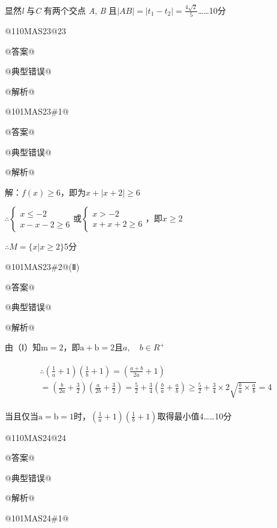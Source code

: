 \documentclass{scrbook}
\begin{document}
显然\textit{l} 与\textit{C} 有两个交点 \textit{A}, \textit{B} 且$|AB|=\left|t_{1}- t_{2}\right|=\frac{4\sqrt{2}}{5}${\ldots}{\ldots}10分

@110MA{\textbar}S23@23

@答案@

@典型错误@

@解析@

@101MA{\textbar}S23\#1@\raisebox{-2.5pt}{（Ⅰ）}

@答案@

@典型错误@

@解析@

解：$f(x)\geq 6，\mathrm{即为}x+|x+2|\geq 6$

$\therefore \left\{\begin{array}{l}
x\leq - 2\\
x- x- 2\geq 6
\end{array}\right.$或$\left\{\begin{array}{l}
x>- 2\\
x+x+2\geq 6
\end{array}\right.$，即$x\geq 2$

$\therefore M=\{x|x\geq 2\}$\raisebox{-5pt}{{\ldots}{\ldots}}5分

@101MA{\textbar}S23\#2@(Ⅱ)

@答案@

@典型错误@

@解析@

由（Ⅰ）知$\mathrm{m}=2$，即$\mathrm{a}+\mathrm{b}=2$且$a,{\quad} b\in R^{+}$

\begin{align*}
\begin{array}{l}
\therefore \left(\frac{1}{a}+1\right)\left(\frac{1}{b}+1\right)=\left(\frac{a+b}{2a}+1\right)\\
=\left(\frac{b}{2a}+\frac{3}{2}\right)\left(\frac{a}{2b}+\frac{3}{2}\right)=\frac{5}{2}+\frac{3}{4}\left(\frac{b}{a}+\frac{a}{b}\right)\geq \frac{5}{2}+\frac{3}{4}\times 2\sqrt{\frac{b}{a}\times \frac{a}{b}}=4
\end{array}
\end{align*}

当且仅当$\mathrm{a}=\mathrm{b}=1$时，$\left(\frac{1}{a}+1\right)\left(\frac{1}{b}+1\right)$取得最小值4{\ldots}{\ldots}10分

@110MA{\textbar}S24@24

@答案@

@典型错误@

@解析@

@101MA{\textbar}S24\#1@\raisebox{-2.5pt}{（Ⅰ）}
\end{document}
